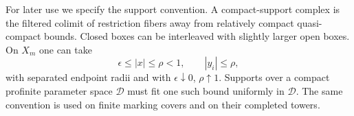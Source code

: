 For later use we specify the support convention. A compact-support
complex is the filtered colimit of restriction fibers away from
relatively compact quasi-compact bounds. Closed boxes can be
interleaved with slightly larger open boxes. On $X_m$ one can take
\[
 \epsilon\leq|x|\leq\rho<1,\qquad |y_i|\leq\rho,
\]
with separated endpoint radii and with $\epsilon\downarrow0$,
$\rho\uparrow1$. Supports over a compact profinite parameter space
$\mathcal D$ must fit one such bound uniformly in $\mathcal D$.
The same convention is used on finite marking covers and on their
completed towers.


